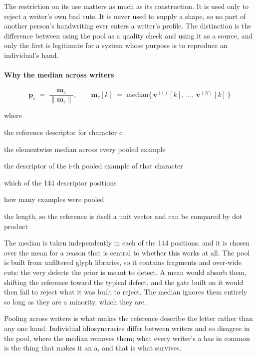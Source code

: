 The restriction on its use matters as much as its construction. It is used only to reject a writer's own bad cuts. It is never used to supply a shape, so no part of another person's handwriting ever enters a writer's profile. The distinction is the difference between using the pool as a quality check and using it as a source, and only the first is legitimate for a system whose purpose is to reproduce an individual's hand.


\paragraph{Why the median across writers}

\begin{equation}
\mathbf{p}_c \;=\; \frac{\mathbf{m}_c}{\|\mathbf{m}_c\|}, \qquad \mathbf{m}_c[k] \;=\; \mathrm{median}\big\{\, \mathbf{v}^{(1)}[k],\, \dots,\, \mathbf{v}^{(N)}[k] \,\big\}
\end{equation}

\noindent where
\begin{description}[leftmargin=2.4em,style=nextline,font=\normalfont\ttfamily]\setlength\itemsep{1pt}
  \item[{$\mathbf{p}_c$}] \normalfont the reference descriptor for character c
  \item[{$\mathbf{m}_c$}] \normalfont the elementwise median across every pooled example
  \item[{$\mathbf{v}^{(i)}$}] \normalfont the descriptor of the i-th pooled example of that character
  \item[{$k$}] \normalfont which of the 144 descriptor positions
  \item[{$N$}] \normalfont how many examples were pooled
  \item[{$\|\cdot\|$}] \normalfont the length, so the reference is itself a unit vector and can be compared by dot product
\end{description}
The median is taken independently in each of the 144 positions, and it is chosen over the mean for a reason that is central to whether this works at all. The pool is built from unfiltered glyph libraries, so it contains fragments and over-wide cuts: the very defects the prior is meant to detect. A mean would absorb them, shifting the reference toward the typical defect, and the gate built on it would then fail to reject what it was built to reject. The median ignores them entirely so long as they are a minority, which they are.

Pooling across writers is what makes the reference describe the letter rather than any one hand. Individual idiosyncrasies differ between writers and so disagree in the pool, where the median removes them; what every writer's a has in common is the thing that makes it an a, and that is what survives.


